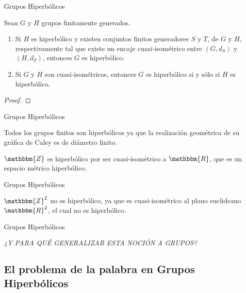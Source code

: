 \documentclass[xcolor=dvipsnames]{beamer}
\theoremstyle{largebreak}
\newcommand{\bbm}[1]{\ensuremath{\mathbbm{#1}}}
\begin{document}
\begin{frame}{Grupos Hiperbólicos}
    \begin{propo}
        Sean $G$ y $H$ grupos finitamente generados.
        \begin{enumerate}[label = \textit{(\arabic*)}]
            \item Si $H$ es hiperbólico y existen conjuntos finitos generadores $S$ y $T$, de $G$ y $H$, respectivamente tal que existe un encaje cuasi-isométrico entre $(G,d_S)$ y $(H,d_T)$, entonces $G$ es hiperbólico.
            \item Si $G$ y $H$ son cuasi-isométricos, entonces $G$ es hiperbólico si y sólo si $H$ es hiperbólico.
        \end{enumerate}
    \end{propo}

    \begin{proof}
    \end{proof}
\end{frame}

\begin{frame}{Grupos Hiperbólicos}
    \begin{exa}
        Todos los grupos finitos son hiperbólicos ya que la realización geométrica de su gráfica de Caley es de diámetro finito.
    \end{exa}

    \begin{exa}
        $\bbm{Z}$ es hiperbólico por ser cuasi-isométrico a $\bbm{R}$, que es un espacio métrico hiperbólico.
    \end{exa}
\end{frame}

\begin{frame}{Grupos Hiperbólicos}
    \begin{exa}
        $\bbm{Z}^2$ no es hiperbólico, ya que es cuasi-isométrico al plano euclideano $\bbm{R}^2$, el cual no es hiperbólico.
    \end{exa}
\end{frame}

\begin{frame}{Grupos Hiperbólicos}
    \begin{center}
        \textit{¿Y PARA QUÉ GENERALIZAR ESTA NOCIÓN A GRUPOS?}
    \end{center}
\end{frame}

\subsection{El problema de la palabra en Grupos Hiperbólicos}
\end{document}

